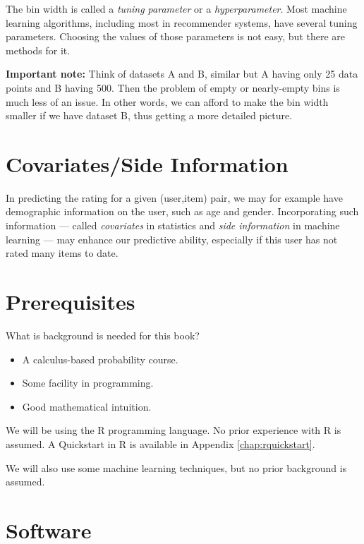 The bin width is called a \textit{tuning parameter} or a
\textit{hyperparameter}.  Most machine learning algorithms, including
most in recommender systems, have several tuning parameters.  Choosing
the values of those parameters is not easy, but there are methods for
it.

\textbf{Important note:} Think of datasets A and B, similar but A having
only 25 data points and B having 500.  Then the problem of empty or
nearly-empty bins is much less of an issue.  In other words, we can
afford to make the bin width smaller if we have dataset B, thus getting
a more detailed picture.

\section{Covariates/Side Information}

In predicting the rating for a given (user,item) pair, we may for
example have demographic information on the user, such as age and
gender.  Incorporating such information --- called \textit{covariates}
in statistics and \textit{side information} in machine learning --- may
enhance our predictive ability, especially if this user has not rated
many items to date.

\section{Prerequisites}

What is background is needed for this book?

\begin{itemize}

\item A calculus-based probability course.

\item Some facility in programming.  

\item Good mathematical intuition.

\end{itemize} 

We will be using the R programming language.  No prior experience with R
is assumed.  A Quickstart in R is available in Appendix
\ref{chap:rquickstart}.

We will also use some machine learning techniques, but no prior
background is assumed.

\section{Software}

